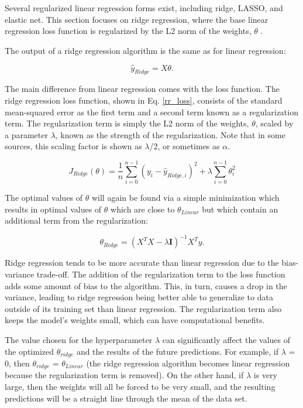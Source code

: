 Several regularized linear regression forms exist, including ridge, LASSO, and elastic net. This section focuses on ridge regression, where the base linear regression loss function is regularized by the L2 norm of the weights, $\theta$ \cite{Ref11, Ref12, Ref168}.

The output of a ridge regression algorithm is the same as for linear regression:

\begin{equation} \label{rr}
    \hat{y}_{Ridge} = X\theta.
\end{equation}

The main difference from linear regression comes with the loss function. The ridge regression loss function, shown in Eq. \ref{rr_loss}, consists of the standard mean-squared error as the first term and a second term known as a regularization term. The regularization term is simply the L2 norm of the weights, $\theta$, scaled by a parameter $\lambda$, known as the strength of the regularization. Note that in some sources, this scaling factor is shown as $\lambda$/2, or sometimes as $\alpha$.

\begin{equation}\label{rr_loss}
    J_{Ridge}(\theta) = \frac{1}{n}\sum_{i=0}^{n-1} (y_i - \hat{y}_{Ridge,i})^2 + \lambda \sum_{i=0}^{n-1} \theta_i^2
\end{equation}

The optimal values of $\theta$ will again be found via a simple minimization which results in optimal values of $\theta$ which are close to $\theta_{Linear}$ but which contain an additional term from the regularization:

\begin{equation}
    \theta_{Ridge} = (X^TX - \lambda\textbf{I})^{-1}X^Ty.
\end{equation}

Ridge regression tends to be more accurate than linear regression due to the bias-variance trade-off. The addition of the regularization term to the loss function adds some amount of bias to the algorithm. This, in turn, causes a drop in the variance, leading to ridge regression being better able to generalize to data outside of its training set than linear regression. The regularization term also keeps the model's weights small, which can have computational benefits.

The value chosen for the hyperparameter $\lambda$ can significantly affect the values of the optimized $\theta_{ridge}$ and the results of the future predictions. For example, if $\lambda$ = 0, then $\theta_{ridge}$ = $\theta_{Linear}$ (the ridge regression algorithm becomes linear regression because the regularization term is removed). On the other hand, if $\lambda$ is very large, then the weights will all be forced to be very small, and the resulting predictions will be a straight line through the mean of the data set. 

